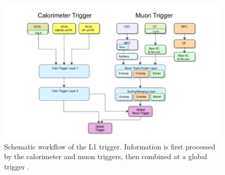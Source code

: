 \begin{figure}[htb]
\centering
  \includegraphics[width=0.75\linewidth]{plots/CMS/l1.PNG} 
  \caption{Schematic workflow of the L1 trigger. Information is first processed by the calorimeter and muon triggers, then combined at a global trigger \protect\cite{Cadamuro:2017slr}.}
  \label{fig:l1_trigger}
\end{figure}
